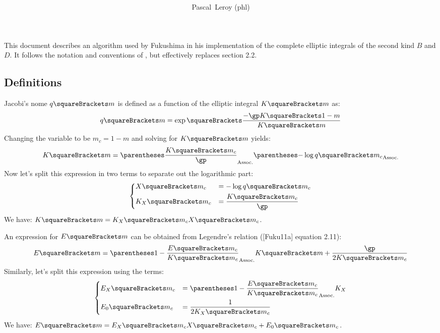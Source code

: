 \documentclass[10pt, a4paper, twoside]{basestyle}
\title{%
\textdisplay{%
On an Algorithm by Fukushima%
}%
}
\author{Pascal~Leroy (phl)}
\begin{document}
\maketitle
\begin{sloppypar}
\noindent
This document describes an algorithm used by Fukushima in his implementation of the complete elliptic integrals of the second kind $B$ and $D$.  It follows the notation and conventions of \cite{Fukushima2011a}, but effectively replaces section 2.2.
\end{sloppypar}

\subsection*{Definitions}
Jacobi's nome $q\of{m}$ is defined as a function of the elliptic integral $K\of{m}$ as:
\[
q\of{m} = \exp\of{\frac{-\gp K\of{1 - m}}{K\of{m}}}
\]
Changing the variable to be $m_c = 1 - m$ and solving for $K\of{m}$ yields:
\[
K\of{m} = \pa{\frac{K\of{m_c}}{\gp}}\pa{-\log q\of{m_c}}
\]
Now let's split this expression in two terms to separate out the logarithmic part:
\[
\begin{dcases}
X\of{m_c} &= -\log q\of{m_c}\\
K_X\of{m_c} &= \frac{K\of{m_c}}{\gp}
\end{dcases}
\]
We have: $K\of{m} = K_X\of{m_c} X\of{m_c}$.

An expression for $E\of{m}$ can be obtained from Legendre's relation ([Fuku11a] equation 2.11):
\[
E\of{m} = \pa{1 - \frac{E\of{m_c}}{K\of{m_c}}} K\of{m} + \frac{\gp}{2 K\of{m_c}}
\]
Similarly, let's split this expression using the terms:
\[
\begin{dcases}
E_X\of{m_c} &= \pa{1 - \frac{E\of{m_c}}{K\of{m_c}}}K_X\\
E_0\of{m_c} &= \frac{1}{2 K_X\of{m_c}}
\end{dcases}
\]
We have: $E\of{m} = E_X\of{m_c} X\of{m_c} + E_0\of{m_c}$.
\end{document}
